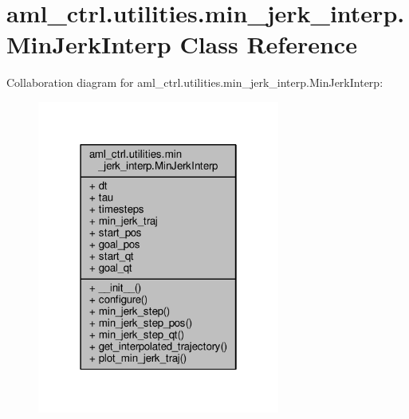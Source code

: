 \hypertarget{classaml__ctrl_1_1utilities_1_1min__jerk__interp_1_1_min_jerk_interp}{\section{aml\-\_\-ctrl.\-utilities.\-min\-\_\-jerk\-\_\-interp.\-Min\-Jerk\-Interp Class Reference}
\label{classaml__ctrl_1_1utilities_1_1min__jerk__interp_1_1_min_jerk_interp}
}


Collaboration diagram for aml\-\_\-ctrl.\-utilities.\-min\-\_\-jerk\-\_\-interp.\-Min\-Jerk\-Interp\-:
\nopagebreak
\begin{figure}[H]
\begin{center}
\leavevmode
\includegraphics[width=226pt]{classaml__ctrl_1_1utilities_1_1min__jerk__interp_1_1_min_jerk_interp__coll__graph}
\end{center}
\end{figure}
